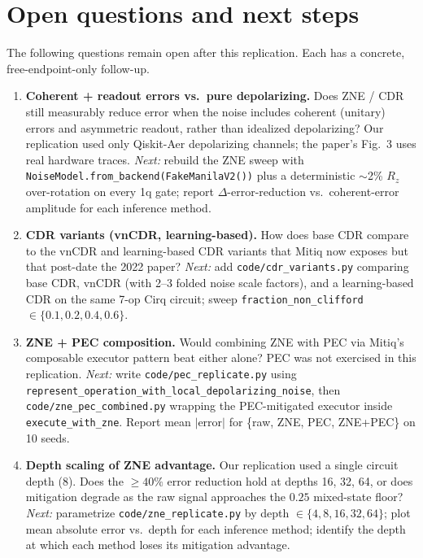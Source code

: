 \section{Open questions and next steps}

The following questions remain open after this replication. Each has a concrete, free-endpoint-only follow-up.

\begin{enumerate}
  \item \textbf{Coherent + readout errors vs.\ pure depolarizing.} Does ZNE / CDR still measurably reduce error when the noise includes coherent (unitary) errors and asymmetric readout, rather than idealized depolarizing? Our replication used only Qiskit-Aer depolarizing channels; the paper's Fig.~3 uses real hardware traces. \emph{Next:} rebuild the ZNE sweep with \texttt{NoiseModel.from\_backend(FakeManilaV2())} plus a deterministic $\sim$2\% $R_z$ over-rotation on every 1q gate; report $\Delta$-error-reduction vs.\ coherent-error amplitude for each inference method.

  \item \textbf{CDR variants (vnCDR, learning-based).} How does base CDR compare to the vnCDR and learning-based CDR variants that Mitiq now exposes but that post-date the 2022 paper? \emph{Next:} add \texttt{code/cdr\_variants.py} comparing base CDR, vnCDR (with 2--3 folded noise scale factors), and a learning-based CDR on the same 7-op Cirq circuit; sweep \texttt{fraction\_non\_clifford} $\in\{0.1, 0.2, 0.4, 0.6\}$.

  \item \textbf{ZNE + PEC composition.} Would combining ZNE with PEC via Mitiq's composable executor pattern beat either alone? PEC was not exercised in this replication. \emph{Next:} write \texttt{code/pec\_replicate.py} using \texttt{represent\_operation\_with\_local\_depolarizing\_noise}, then \texttt{code/zne\_pec\_combined.py} wrapping the PEC-mitigated executor inside \texttt{execute\_with\_zne}. Report mean $|\text{error}|$ for \{raw, ZNE, PEC, ZNE+PEC\} on 10 seeds.

  \item \textbf{Depth scaling of ZNE advantage.} Our replication used a single circuit depth (8). Does the $\ge 40\%$ error reduction hold at depths 16, 32, 64, or does mitigation degrade as the raw signal approaches the $0.25$ mixed-state floor? \emph{Next:} parametrize \texttt{code/zne\_replicate.py} by depth $\in \{4,8,16,32,64\}$; plot mean absolute error vs.\ depth for each inference method; identify the depth at which each method loses its mitigation advantage.


\end{enumerate}
